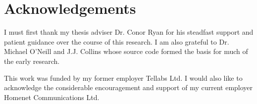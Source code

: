 \thispagestyle{plain}
\chapter*{Acknowledgements}
I must first thank my thesis adviser Dr. Conor Ryan for his steadfast support and patient guidance over the course of this research. I am also grateful to Dr. Michael O'Neill and J.J. Collins whose source code formed the basis for much of the early research. 

This work was funded by my former employer Tellabs Ltd. I would also like to acknowledge the considerable  encouragement and support of my current employer Homenet Communications Ltd.   



